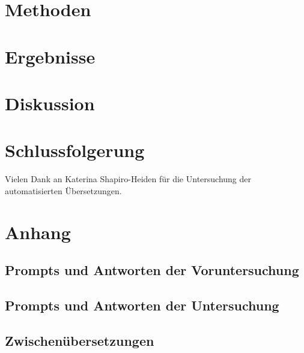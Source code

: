 \documentclass[acmlarge,authorversion,nonacm]{acmart}
\begin{document}
\section{Methoden}\label{sec:methods}


\section{Ergebnisse}\label{sec:results}


\section{Diskussion}\label{sec:discussion}


\section{Schlussfolgerung}\label{sec:conclusion}


\begin{acks}
Vielen Dank an Katerina Shapiro-Heiden für die Untersuchung der automatisierten Übersetzungen.
\end{acks}




\newpage
\appendix

\section{Anhang}

\subsection{Prompts und Antworten der Voruntersuchung}


\subsection{Prompts und Antworten der Untersuchung}


\subsection{Zwischenübersetzungen}




\end{document}
